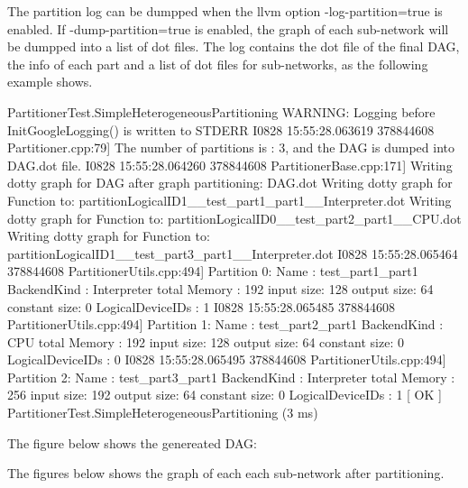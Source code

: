 The partition log can be dumpped when the llvm option {\ttfamily -\/log-\/partition=true} is enabled. If {\ttfamily -\/dump-\/partition=true} is enabled, the graph of each sub-\/network will be dumpped into a list of dot files. The log contains the dot file of the final D\+AG, the info of each part and a list of dot files for sub-\/networks, as the following example shows. 
\begin{DoxyCode}
[ RUN      ] PartitionerTest.SimpleHeterogeneousPartitioning
WARNING: Logging before InitGoogleLogging() is written to STDERR
I0828 15:55:28.063619 378844608 Partitioner.cpp:79] The number of partitions is : 3, and the DAG is dumped
       into DAG.dot file.
I0828 15:55:28.064260 378844608 PartitionerBase.cpp:171] Writing dotty graph for DAG after graph
       partitioning: DAG.dot
Writing dotty graph for Function to: partitionLogicalID1\_\_test\_part1\_part1\_\_Interpreter.dot
Writing dotty graph for Function to: partitionLogicalID0\_\_test\_part2\_part1\_\_CPU.dot
Writing dotty graph for Function to: partitionLogicalID1\_\_test\_part3\_part1\_\_Interpreter.dot
I0828 15:55:28.065464 378844608 PartitionerUtils.cpp:494]    Partition 0:
                   Name :   test\_part1\_part1
               BackendKind :    Interpreter
               total Memory :   192
                     input size:    128
                 output size:   64
                 constant size: 0
               LogicalDeviceIDs :   1
I0828 15:55:28.065485 378844608 PartitionerUtils.cpp:494]    Partition 1:
                   Name :   test\_part2\_part1
               BackendKind :    CPU
               total Memory :   192
                     input size:    128
                     output size:   64
                 constant size: 0
               LogicalDeviceIDs :   0
I0828 15:55:28.065495 378844608 PartitionerUtils.cpp:494]     Partition 2:
                   Name :   test\_part3\_part1
               BackendKind :    Interpreter
               total Memory :   256
                     input size:    192
                     output size:   64
                     constant size: 0
               LogicalDeviceIDs :   1
[       OK ] PartitionerTest.SimpleHeterogeneousPartitioning (3 ms)
\end{DoxyCode}


The figure below shows the genereated D\+AG\+:



The figures below shows the graph of each each sub-\/network after partitioning.

   